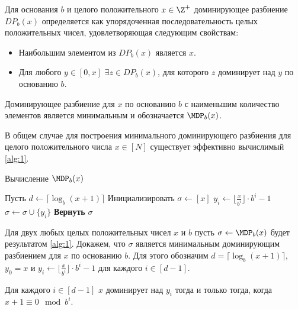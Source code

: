 \begin{definition}
	Для основания $b$ и целого положительного $x \in \Z^+$ доминирующее разбиение $DP_b(x)$ определяется как упорядоченная последовательность целых положительных чисел, удовлетворяющая следующим свойствам:
	\begin{itemize}
		\item Наибольшим элементом из $DP_b(x)$ является $x$.
		\item Для любого $y \in [0, x]$ $\exists z \in DP_b(x)$, для которого $z$ доминирует над $y$ по основанию $b$.
	\end{itemize}
\end{definition}

\begin{definition}
	Доминирующее разбиение для $x$ по основанию $b$ с наименьшим количество элементов является минимальным и обозначается $\MDP_b(x)$.
\end{definition}


В общем случае для построения минимального доминирующего разбиения для целого положительного числа $x \in [N]$ существует эффективно вычислимый \ref{alg:1}.

\begin{algorithm}
    \caption{Вычисление $\MDP_b(x)$}
    \label{alg:1}
    \begin{algorithmic}
        \STATE Пусть $d \leftarrow \lceil \log_b(x+1) \rceil$
        \STATE Инициализировать $\sigma \leftarrow [x]$
                \STATE $y_i \leftarrow \lfloor \frac{x}{b^i} \rfloor \cdot b^i - 1$
                \STATE $\sigma \leftarrow \sigma \cup \{y_i\}$
            \ENDIF
        \ENDFOR
        \STATE \textbf{Вернуть} $\sigma$
    \end{algorithmic}
\end{algorithm}

Для двух любых целых положительных чисел $x$ и $b$ пусть $\sigma \leftarrow \MDP_b(x)$ будет результатом \ref{alg:1}.
Докажем, что $\sigma$ является минимальным доминирующим разбиением для $x$ по основанию $b$.
Для этого обозначим $d = \lceil \log_b(x + 1) \rceil$, $y_0 = x$ и $y_i \leftarrow \lfloor \frac{x}{b^i} \rfloor \cdot b^i - 1$ для каждого $i \in [d - 1]$.

\begin{theorem}
	\label{lemma:1}
	Для каждого $i \in [d - 1]$ $x$ доминирует над $y_i$ тогда и только тогда, когда $x + 1 \equiv 0 \mod b^i$.
\end{theorem}

